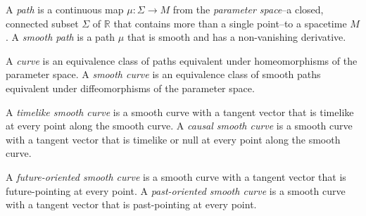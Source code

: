 \begin{definition}[Paths]
    \label{def:paths}
    \leanok
    A \textit{path} is a continuous map $\mu :\Sigma \rightarrow M$ from the \textit{parameter space}--a closed, connected subset $\Sigma$ of $\mathbb{R}$ that contains more than a single point--to a spacetime $M$. A \textit{smooth path} is a path $\mu$ that is smooth and has a non-vanishing derivative.
\end{definition}

\begin{definition}[Curves]
    \label{def:curves}
    \leanok
    A \textit{curve} is an equivalence class of paths equivalent under homeomorphisms of the parameter space. A \textit{smooth curve} is an equivalence class of smooth paths equivalent under diffeomorphisms of the parameter space.
\end{definition}

\begin{definition}
    \label{def:timelike-and-causal-smooth-curves}
    \leanok
    A \textit{timelike smooth curve} is a smooth curve with a tangent vector that is timelike at every point along the smooth curve. A \textit{causal smooth curve} is a smooth curve with a tangent vector that is timelike or null at every point along the smooth curve.
\end{definition}

\begin{definition}
    \label{def:future-and-past-oriented-smooth-curves}
    \leanok
    A \textit{future-oriented smooth curve} is a smooth curve with a tangent vector that is future-pointing at every point. A \textit{past-oriented smooth curve} is a smooth curve with a tangent vector that is past-pointing at every point.
\end{definition}

